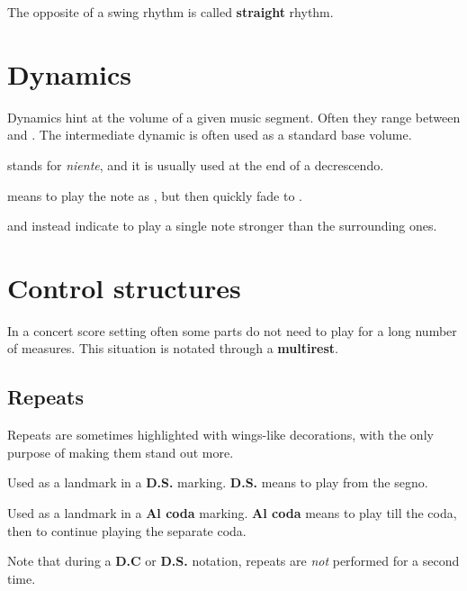 The opposite of a swing rhythm is called \textbf{straight} rhythm.

\section{Dynamics}
Dynamics hint at the volume of a given music segment. Often they range between  and . The intermediate dynamic  is often used as a standard base volume.

 stands for \emph{niente}, and it is usually used at the end of a decrescendo.

 means to play the note as , but then quickly fade to .

 and  instead indicate to play a single note stronger than the surrounding ones.

\section{Control structures}
In a concert score setting often some parts do not need to play for a long number of measures. This situation is notated through a \textbf{multirest}.

\subsection{Repeats}
Repeats are sometimes highlighted with wings-like decorations, with the only purpose of making them stand out more.

\begin{definition}[Segno]
    Used as a landmark in a \textbf{D.S.} marking. \textbf{D.S.} means to play from the segno.
\end{definition}

\begin{definition}[Coda]
    Used as a landmark in a \textbf{Al coda} marking. \textbf{Al coda} means to play till the coda, then to continue playing the separate coda.
\end{definition}

Note that during a \textbf{D.C} or \textbf{D.S.} notation, repeats are \emph{not} performed for a second time.

